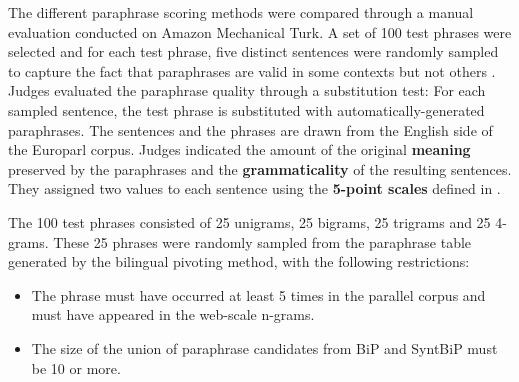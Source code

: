 \documentclass[11pt]{article}
\begin{document}
The different paraphrase scoring methods were compared through a manual evaluation conducted on Amazon Mechanical Turk.
A set of 100 test phrases were selected and for each test phrase, five distinct sentences were randomly sampled to capture the fact that paraphrases are valid in some contexts but not others \cite{Szpektor2007}.
%
Judges evaluated the paraphrase quality through a substitution test: For each sampled sentence, the test phrase is substituted with automatically-generated paraphrases.  The sentences and the phrases are drawn from the English side of the Europarl corpus.  %
Judges indicated the amount of the original {\bf meaning} preserved by the paraphrases and the {\bf grammaticality} of the resulting sentences.  They assigned two values to each sentence using the {\bf 5-point scales} defined in %
.

The 100 test phrases consisted of 25 unigrams, 25 bigrams, 25 trigrams and 25 4-grams.  These  25 phrases were randomly sampled from the paraphrase table generated by the bilingual pivoting method, with the following restrictions: 

\vspace{-.1cm}
\begin{itemize}
\vspace{-.1cm}
\item The phrase must have occurred at least 5 times in the parallel corpus and must have appeared in the web-scale n-grams.
\vspace{-.1cm}
\item The size of the union of paraphrase candidates from BiP and SyntBiP must be 10 or more.
\vspace{-.1cm}
\end{itemize}
\end{document}

